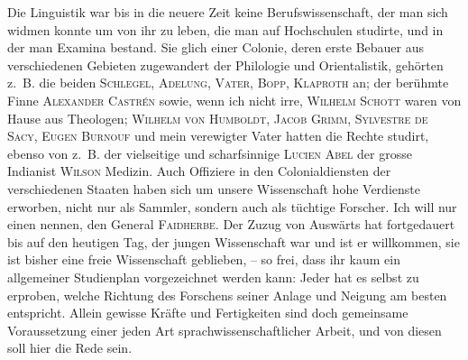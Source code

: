 Die Linguistik war bis in die neuere Zeit keine Berufswissenschaft, der man sich widmen konnte um von ihr zu leben, die man auf Hochschulen studirte, und in der man Examina bestand. Sie glich einer Colonie, deren erste Bebauer aus verschiedenen Gebieten zugewandert    der Philologie und Orientalistik, gehörten z.~B. die beiden \textsc{Schlegel}, \textsc{Adelung}, \textsc{Vater}, \textsc{Bopp}, \textsc{Klaproth} an; der berühmte Finne \textsc{Alexander Castrén} sowie, wenn ich nicht irre, \textsc{Wilhelm Schott} waren von Hause aus Theologen; \textsc{Wilhelm von Humboldt}, \textsc{Jacob Grimm}, \textsc{Sylvestre de Sacy}, \textsc{Eugen Burnouf} und mein verewigter Vater hatten die Rechte studirt, ebenso von  z.~B. der vielseitige und scharfsinnige \textsc{Lucien}   \textsc{Abel}  der grosse Indianist \textsc{Wilson}  Medizin. Auch Offiziere in den Colonialdiensten der \label{sp.32} verschiedenen Staaten haben sich um unsere Wissenschaft hohe Verdienste erworben, nicht nur als Sammler, sondern auch als tüchtige Forscher. Ich will nur einen nennen, den General \textsc{Faidherbe}. Der Zuzug von Auswärts hat fortgedauert bis auf den heutigen Tag, der jungen Wissenschaft war und ist er willkommen, sie ist bisher eine freie Wissenschaft geblieben, – so frei, dass ihr kaum ein allgemeiner Studienplan vorgezeichnet werden kann: Jeder hat es selbst zu erproben, welche Richtung des Forschens seiner Anlage und Neigung am besten entspricht.  Allein gewisse Kräfte und Fertigkeiten sind doch gemeinsame Voraussetzung einer jeden Art sprachwissenschaftlicher Arbeit, und von diesen soll hier die Rede sein.

